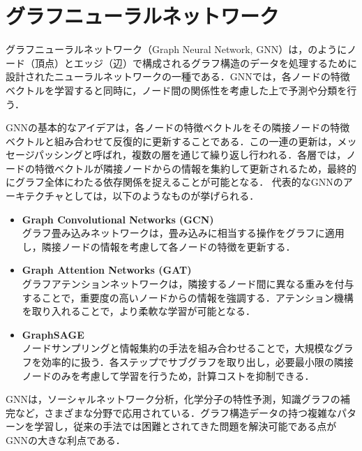 
\section{グラフニューラルネットワーク}
グラフニューラルネットワーク（Graph Neural Network, GNN）は，のようにノード（頂点）とエッジ（辺）で構成されるグラフ構造のデータを処理するために設計されたニューラルネットワークの一種である．GNNでは，各ノードの特徴ベクトルを学習すると同時に，ノード間の関係性を考慮した上で予測や分類を行う．

GNNの基本的なアイデアは，各ノードの特徴ベクトルをその隣接ノードの特徴ベクトルと組み合わせて反復的に更新することである．この一連の更新は，メッセージパッシングと呼ばれ，複数の層を通じて繰り返し行われる．各層では，ノードの特徴ベクトルが隣接ノードからの情報を集約して更新されるため，最終的にグラフ全体にわたる依存関係を捉えることが可能となる．
代表的なGNNのアーキテクチャとしては，以下のようなものが挙げられる．
\begin{itemize}
  \item \textbf{Graph Convolutional Networks (GCN)}\\
  グラフ畳み込みネットワークは，畳み込みに相当する操作をグラフに適用し，隣接ノードの情報を考慮して各ノードの特徴を更新する．
  \item \textbf{Graph Attention Networks (GAT)}\\
  グラフアテンションネットワークは，隣接するノード間に異なる重みを付与することで，重要度の高いノードからの情報を強調する．アテンション機構を取り入れることで，より柔軟な学習が可能となる．
  \item \textbf{GraphSAGE}\\
  ノードサンプリングと情報集約の手法を組み合わせることで，大規模なグラフを効率的に扱う．各ステップでサブグラフを取り出し，必要最小限の隣接ノードのみを考慮して学習を行うため，計算コストを抑制できる．
\end{itemize}

GNNは，ソーシャルネットワーク分析，化学分子の特性予測，知識グラフの補完など，さまざまな分野で応用されている．グラフ構造データの持つ複雑なパターンを学習し，従来の手法では困難とされてきた問題を解決可能である点がGNNの大きな利点である．


\newpage
